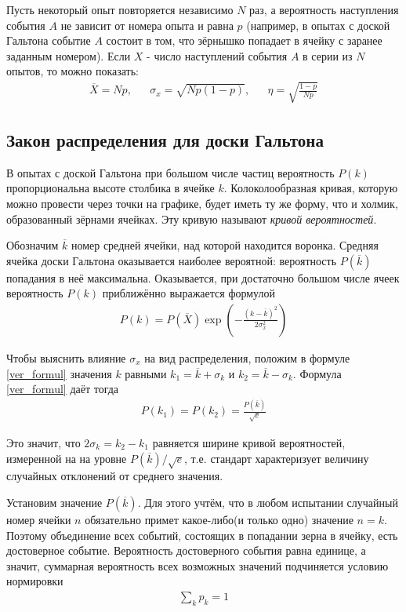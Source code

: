 Пусть некоторый опыт повторяется независимо $N$ раз, а вероятность наступления события $A$ не зависит от номера опыта и равна $p$ (например, в опытах с доской Гальтона событие $A$ состоит в том, что зёрнышко попадает в ячейку с заранее заданным номером). Если $X$ - число наступлений события $A$ в серии из $N$ опытов, то можно показать:
\begin{align}
	\overline{X} = N p, && \sigma_x = \sqrt{N p (1 - p)}, && \eta = \sqrt{\frac{1 - p}{N p}}
\end{align}

\subsection{Закон распределения для доски Гальтона}

В опытах с доской Гальтона при большом числе частиц вероятность $P(k)$ пропорциональна высоте столбика в ячейке $k$. Колоколообразная кривая, которую можно провести через точки на графике, будет иметь ту же форму, что и холмик, образованный зёрнами  ячейках. Эту кривую называют \textit{кривой вероятностей}.

Обозначим $\overline{k}$ номер средней ячейки, над которой находится воронка. Средняя ячейка доски Гальтона оказывается наиболее вероятной: вероятность $P(\overline{k})$ попадания в неё максимальна. Оказывается, при достаточно большом числе ячеек вероятность $P(k)$ приближённо выражается формулой
\begin{align} \label{ver_formul}
	P(k) = P(\overline{X})
	\exp \left( - \frac{(k - \overline{k})^2}{2 \sigma_x^2} \right)
\end{align}

Чтобы выяснить влияние $\sigma_x$ на вид распределения, положим в формуле \eqref{ver_formul} значения $k$ равными $k_1 = \overline{k} + \sigma_k$ и $k_2 = \overline{k} - \sigma_k$. Формула \eqref{ver_formul} даёт тогда 
\begin{align*}
	P(k_1) = P(k_2) = \frac{P(\overline{k})}{\sqrt{e}} 
\end{align*}

Это значит, что $2\sigma_k = k_2 - k_1$ равняется ширине кривой вероятностей, измеренной на на уровне ${P(\overline{k})}/{\sqrt{e}}$, т.е. стандарт характеризует величину случайных отклонений от среднего значения.

Установим значение $P(\overline{k})$. Для этого учтём, что в любом испытании случайный номер ячейки $n$ обязательно примет какое-либо(и только одно) значение $n = k$. Поэтому объединение всех событий, состоящих в попадании зерна в ячейку, есть достоверное событие. Вероятность достоверного события равна единице, а значит, суммарная вероятность всех возможных значений подчиняется условию нормировки 
\begin{align} \label{usl_normir}
	\sum_{k} p_k = 1
\end{align}

